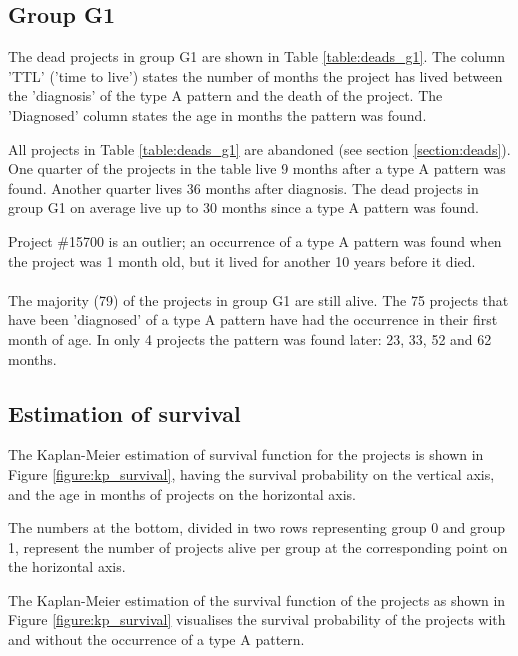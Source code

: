 \subsection{Group G1}
\label{section:group_g1}
The dead projects in group G1 are shown in Table \ref{table:deads_g1}. The
column 'TTL' ('time to live') states the number of months the project has
lived between the 'diagnosis' of the type A pattern and the death of the
project. The 'Diagnosed' column states the age in months the pattern was found.



\noindent
All projects in Table \ref{table:deads_g1} are abandoned (see section
\ref{section:deads}). One quarter of the projects in the table live 9 months
after a type A pattern was found. Another quarter lives 36 months after
diagnosis. The dead projects in group G1 on average live up to 30 months since
a type A pattern was found.

Project \#15700 is an outlier; an occurrence of a type A pattern was found when
the project was 1 month old, but it lived for another 10 years before it died.

\paragraph{}
The majority (79) of the projects in group G1 are still alive. The 75 projects
that have been 'diagnosed' of a type A pattern have had the occurrence in their
first month of age. In only 4 projects the pattern was found later: 23, 33, 52
and 62 months.

\subsection{Estimation of survival}
\label{section:kp_survival_results}
The Kaplan-Meier estimation of survival function for the projects is shown in
Figure \ref{figure:kp_survival}, having the survival probability on the
vertical axis, and the age in months of projects on the horizontal axis.

The numbers at the bottom, divided in two rows representing group 0 and group
1, represent the number of projects alive per group at the corresponding point
on the horizontal axis.



\noindent
The Kaplan-Meier estimation of the survival function of the projects as shown
in Figure \ref{figure:kp_survival} visualises the survival probability of
the projects with and without the occurrence of a type A pattern.

